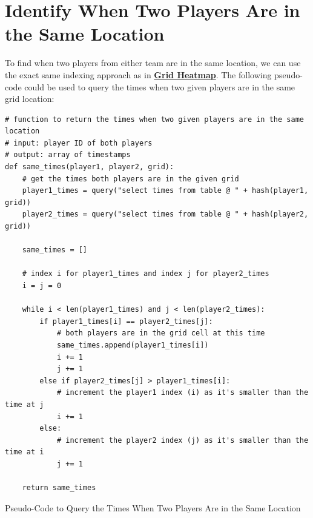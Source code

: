 \documentclass[a4paper,11pt]{article}
\newenvironment{code}{\captionsetup{type=listing}}{}
\begin{document}
\section{Identify When Two Players Are in the Same Location}
To find when two players from either team are in the same location, we can use the exact same indexing approach as in \textbf{\hyperref[sec:heatmap]{ Grid Heatmap}}. 
The following pseudo-code could be used to query the times when two given players are in the same grid location:
\begin{code}
\begin{verbatim}
# function to return the times when two given players are in the same location
# input: player ID of both players
# output: array of timestamps 
def same_times(player1, player2, grid):
    # get the times both players are in the given grid
    player1_times = query("select times from table @ " + hash(player1, grid))
    player2_times = query("select times from table @ " + hash(player2, grid))
    
    same_times = []
    
    # index i for player1_times and index j for player2_times
    i = j = 0
    
    while i < len(player1_times) and j < len(player2_times):
        if player1_times[i] == player2_times[j]:
            # both players are in the grid cell at this time
            same_times.append(player1_times[i])
            i += 1
            j += 1
        else if player2_times[j] > player1_times[i]:
            # increment the player1 index (i) as it's smaller than the time at j
            i += 1
        else:
            # increment the player2 index (j) as it's smaller than the time at i
            j += 1
    
    return same_times     
\end{verbatim}
\caption{Pseudo-Code to Query the Times When Two Players Are in the Same Location}
\end{code}
 
\end{document}
